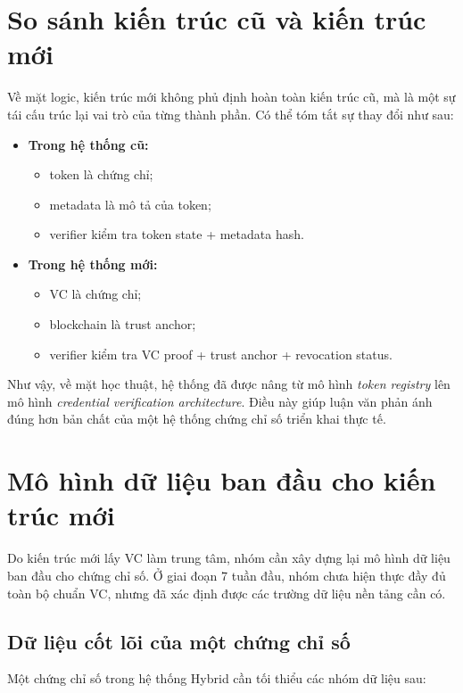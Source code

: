 \section{So sánh kiến trúc cũ và kiến trúc mới}

Về mặt logic, kiến trúc mới không phủ định hoàn toàn kiến trúc cũ, mà là một sự tái cấu trúc lại vai trò của từng thành phần. Có thể tóm tắt sự thay đổi như sau:

\begin{itemize}
    \item \textbf{Trong hệ thống cũ:}
    \begin{itemize}
        \item token là chứng chỉ;
        \item metadata là mô tả của token;
        \item verifier kiểm tra token state + metadata hash.
    \end{itemize}

    \item \textbf{Trong hệ thống mới:}
    \begin{itemize}
        \item VC là chứng chỉ;
        \item blockchain là trust anchor;
        \item verifier kiểm tra VC proof + trust anchor + revocation status.
    \end{itemize}
\end{itemize}

Như vậy, về mặt học thuật, hệ thống đã được nâng từ mô hình \textit{token registry} lên mô hình \textit{credential verification architecture}. Điều này giúp luận văn phản ánh đúng hơn bản chất của một hệ thống chứng chỉ số triển khai thực tế.

\section{Mô hình dữ liệu ban đầu cho kiến trúc mới}

Do kiến trúc mới lấy VC làm trung tâm, nhóm cần xây dựng lại mô hình dữ liệu ban đầu cho chứng chỉ số. Ở giai đoạn 7 tuần đầu, nhóm chưa hiện thực đầy đủ toàn bộ chuẩn VC, nhưng đã xác định được các trường dữ liệu nền tảng cần có.

\subsection{Dữ liệu cốt lõi của một chứng chỉ số}
Một chứng chỉ số trong hệ thống Hybrid cần tối thiểu các nhóm dữ liệu sau:

